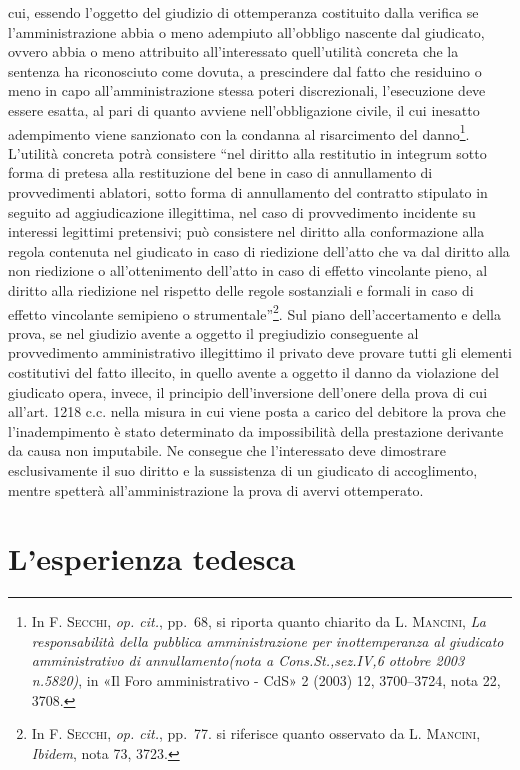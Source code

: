 \documentclass[12pt,it,a4paper,]{report}
\begin{document}
cui, essendo l'oggetto del giudizio di ottemperanza costituito dalla
verifica se l'amministrazione abbia o meno adempiuto all'obbligo
nascente dal giudicato, ovvero abbia o meno attribuito all'interessato
quell'utilità concreta che la sentenza ha riconosciuto come dovuta, a
prescindere dal fatto che residuino o meno in capo all'amministrazione
stessa poteri discrezionali, l'esecuzione deve essere esatta, al pari di
quanto avviene nell'obbligazione civile, il cui inesatto adempimento
viene sanzionato con la condanna al risarcimento del danno\footnote{In
  \textsc{F. Secchi}, \emph{op. cit.}, pp.~68, si riporta quanto
  chiarito da L. \textsc{Mancini}, \emph{La responsabilità della
  pubblica amministrazione per inottemperanza al giudicato
  amministrativo di annullamento(nota a Cons.St.,sez.IV,6 ottobre 2003
  n.5820)}, in {«Il Foro amministrativo - CdS»} 2 (2003) 12, 3700--3724,
  nota 22, 3708.}. L'utilità concreta potrà consistere ``nel diritto
alla restitutio in integrum sotto forma di pretesa alla restituzione del
bene in caso di annullamento di provvedimenti ablatori, sotto forma di
annullamento del contratto stipulato in seguito ad aggiudicazione
illegittima, nel caso di provvedimento incidente su interessi legittimi
pretensivi; può consistere nel diritto alla conformazione alla regola
contenuta nel giudicato in caso di riedizione dell'atto che va dal
diritto alla non riedizione o all'ottenimento dell'atto in caso di
effetto vincolante pieno, al diritto alla riedizione nel rispetto delle
regole sostanziali e formali in caso di effetto vincolante semipieno o
strumentale''\footnote{In \textsc{F. Secchi}, \emph{op. cit.}, pp.~77.
  si riferisce quanto osservato da L. \textsc{Mancini}, \emph{Ibidem},
  nota 73, 3723.}. Sul piano dell'accertamento e della prova, se nel
giudizio avente a oggetto il pregiudizio conseguente al provvedimento
amministrativo illegittimo il privato deve provare tutti gli elementi
costitutivi del fatto illecito, in quello avente a oggetto il danno da
violazione del giudicato opera, invece, il principio dell'inversione
dell'onere della prova di cui all'art. 1218 c.c. nella misura in cui
viene posta a carico del debitore la prova che l'inadempimento è stato
determinato da impossibilità della prestazione derivante da causa non
imputabile. Ne consegue che l'interessato deve dimostrare esclusivamente
il suo diritto e la sussistenza di un giudicato di accoglimento, mentre
spetterà all'amministrazione la prova di avervi ottemperato.

\hypertarget{lesperienza-tedesca}{%
\chapter{L'esperienza tedesca}\label{lesperienza-tedesca}}
\end{document}
